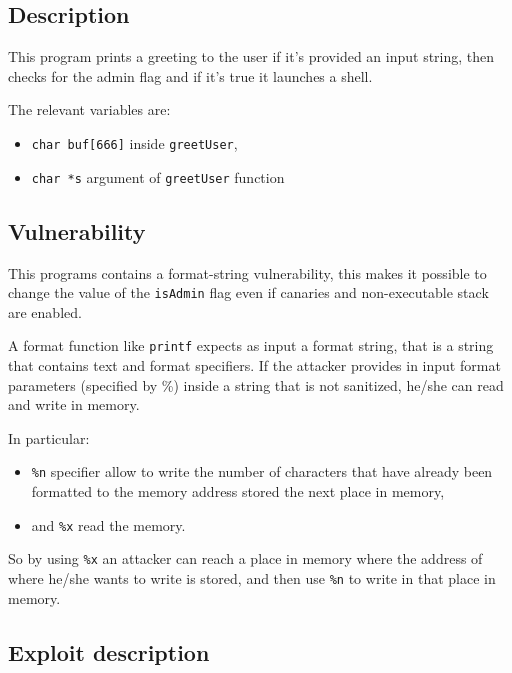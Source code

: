 \documentclass[a4paper,12pt]{article}
\begin{document}
\subsection{Description}
This program prints a greeting to the user if it's provided an input string, then checks for the admin flag and if it's true it launches a shell. 

The relevant variables are:
\begin{itemize}

\item \texttt{char buf[666]} inside \texttt{greetUser},
\item \texttt{char *s} argument of \texttt{greetUser} function

\end{itemize}


\subsection{Vulnerability}

This programs contains a format-string vulnerability, this makes it possible to change the value of the \texttt{isAdmin} flag even if canaries and non-executable stack are enabled.

A format function like \texttt{printf} expects as input a format string, that is a string that contains text and format specifiers. If the attacker provides in input format parameters (specified by \%) inside a string that is not sanitized, he/she can read and write in memory. 

In particular:
\begin{itemize}
\item \texttt{\%n} specifier allow to write the number of characters that have already been formatted to the memory address stored the next place in memory,
\item and \texttt{\%x} read the memory.
\end{itemize} 

So by using \texttt{\%x} an attacker can reach a place in memory where the address of where he/she wants to write is stored, and then use \texttt{\%n} to write in that place in memory.


\subsection{Exploit description}
\end{document}
